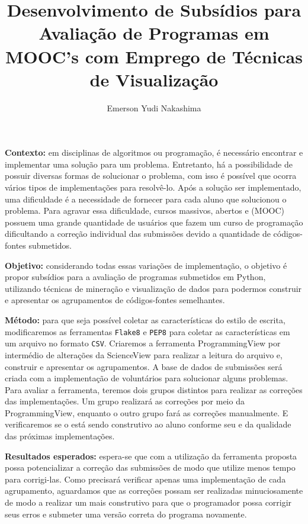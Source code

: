 \documentclass[12pt,english,brazil,a4paper,utf8,oneside]{utfpr-tcc}
\author{Emerson Yudi Nakashima}  %
\title{Desenvolvimento de Subsídios para Avaliação de Programas em MOOC's com Emprego de Técnicas de Visualização} %
\begin{document}
	
\frontmatter
\maketitle

\begin{resumo}
\textbf{Contexto:} em disciplinas de algoritmos ou programação, é necessário encontrar
e implementar uma solução para um problema. Entretanto, há a possibilidade de possuir
diversas formas de solucionar o problema, com isso é possível que ocorra vários tipos
de implementações para resolvê-lo. Após a solução ser implementado, uma dificuldade é
a necessidade de fornecer  para cada aluno que solucionou o problema.
Para agravar essa dificuldade, cursos massivos, abertos e  (MOOC) possuem
uma grande quantidade de usuários que fazem um curso de programação dificultando a correção
individual das submissões devido a quantidade de códigos-fontes submetidos.

\textbf{Objetivo:} considerando todas essas variações de implementação, o objetivo é
propor subsídios para a avaliação de programas submetidos em Python, utilizando técnicas
de mineração e visualização de dados para podermos construir e apresentar os agrupamentos
de códigos-fontes semelhantes.

\textbf{Método:} para que seja possível coletar as características do estilo de escrita,
modificaremos as ferramentas \texttt{Flake8} e \texttt{PEP8} para coletar as
características em um arquivo no formato \texttt{CSV}. Criaremos a ferramenta
ProgrammingView por intermédio de alterações da ScienceView para realizar a leitura do
arquivo e, construir e apresentar os agrupamentos. A base de dados de submissões será
criada com a implementação de voluntários para solucionar alguns problemas. Para avaliar
a ferramenta, teremos dois grupos distintos para realizar as correções das implementações.
Um grupo realizará as correções por meio da ProgrammingView, enquanto o outro grupo fará as
correções manualmente. E verificaremos se o  está sendo construtivo
ao aluno conforme seu  e da qualidade das próximas implementações.

\textbf{Resultados esperados:} espera-se que com a utilização da ferramenta proposta possa
potencializar a correção das submissões de modo que utilize menos tempo para corrigi-las.
Como precisará verificar apenas uma implementação de cada agrupamento, aguardamos que
as correções possam ser realizadas minuciosamente de modo a realizar um 
mais construtivo para que o programador possa corrigir seus erros e submeter uma versão
correta do programa novamente.



\end{resumo}
\end{document}
